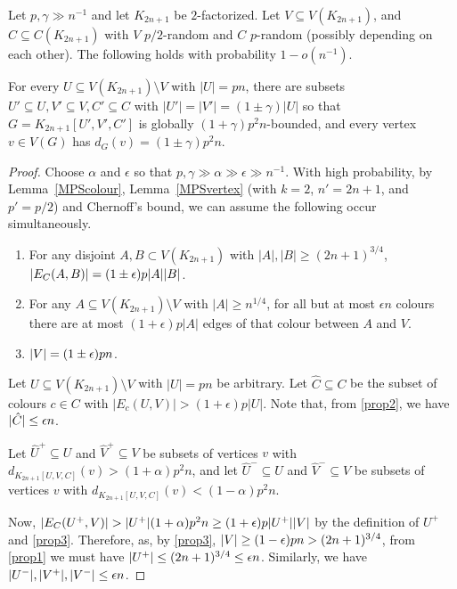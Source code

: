 \begin{lemma}\label{Lemma_nearly_regular_subgraph}
Let $p, \gamma\gg n^{-1}$ and let  $K_{2n+1}$ be $2$-factorized.
Let $V\subseteq V(K_{2n+1})$, and $C\subseteq C(K_{2n+1})$  with $V$ $p/2$-random and $C$ $p$-random (possibly depending on each other). The following holds with  probability $1-o(n^{-1})$.

For every $U\subseteq V(K_{2n+1})\setminus V$  with $|U|= pn$, there are subsets $U'\subseteq U, V'\subseteq V, C'\subseteq C$ with $|U'|=|V'|= (1\pm\gamma)|U|$
so that $G=K_{2n+1}[U',V',C']$ is globally $(1+\gamma)p^2n$-bounded, and every vertex $v\in V(G)$ has $d_{G}(v)=(1\pm\gamma)p^2n$.
\end{lemma}
\begin{proof}
Choose $\alpha$ and $\epsilon$ so that $p, \gamma\gg \alpha\gg \epsilon\gg n^{-1}$. With high probability, by Lemma~\ref{MPScolour}, Lemma~\ref{MPSvertex} (with $k=2$, $n'=2n+1$, and $p'=p/2$) and Chernoff's bound, we can assume the following occur simultaneously.
\begin{enumerate}[label = (\roman{enumi})]
\item \label{prop1} For any disjoint $A,B\subset V(K_{2n+1})$ with $|A|,|B|\geq (2n+1)^{3/4}$, $|E_C(A,B)|=(1\pm \epsilon)p|A||B|$.
\item \label{prop2} For any $A\subseteq V(K_{2n+1})\setminus V$ with $|A|\geq n^{1/4}$, for all but at most $\epsilon n$ colours there are at most $(1+\epsilon)p|A|$ edges of that colour between $A$ and $V$.
\item \label{prop3} $|V|=(1\pm \epsilon)pn$.
\end{enumerate}



Let $U\subseteq V(K_{2n+1})\setminus V$ with $|U|= pn$ be arbitrary. Let $\hat C\subseteq C$ be the subset of colours $c\in C$ with $|E_c(U,V)|> (1+ \epsilon)p|U|$. Note that, from \ref{prop2}, we have $|\hat C|\leq \epsilon n$.


Let $\hat U^+\subseteq U$ and $\hat V^+\subseteq V$ be subsets of vertices $v$ with $d_{K_{2n+1}[U,V,C]}(v)> (1+ \alpha)p^2 n$, and let $\hat U^-\subseteq U$ and $\hat V^-\subseteq V$ be subsets of vertices $v$ with $d_{K_{2n+1}[U,V,C]}(v)< (1- \alpha)p^2 n$.

Now, $|E_C(U^+,V)|> |U^+|(1+\alpha)p^2 n\geq (1+\eps)p|U^+||V|$ by the definition of $U^+$ and \ref{prop3}. Therefore, as, by \ref{prop3}, $|V|\geq (1-\epsilon)pn>(2n+1)^{3/4}$, from \ref{prop1} we must have $|U^+|\leq (2n+1)^{3/4}\leq \epsilon n$. Similarly, we have $|U^-|,|V^+|,|V^-|\leq \epsilon n$.


\end{proof}

